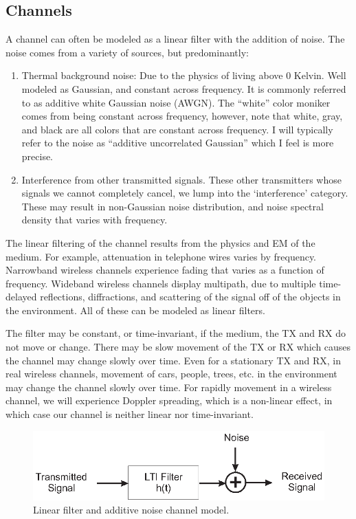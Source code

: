 \subsection{Channels}

A channel can often be modeled as a linear filter with the
addition of noise.  The noise comes from a variety of sources, but
predominantly:
\begin{enumerate}
  \item Thermal background noise:  Due to the physics of living
  above 0 Kelvin.  Well modeled as Gaussian, and constant across frequency.  It is
  commonly referred to as additive white Gaussian noise (AWGN).  The ``white'' color moniker comes from being constant across frequency, however, note that white, gray, and black are all colors
  that are constant across frequency.  I will typically refer to the noise as ``additive uncorrelated Gaussian'' which I feel is more precise.
  \item Interference from other transmitted signals.  These other
  transmitters whose signals we cannot completely cancel, we lump
  into the `interference' category.  These may result in non-Gaussian
  noise distribution, and  noise spectral density that varies with frequency.
\end{enumerate}
The linear filtering of the channel results from the physics and EM
of the medium.  For example, attenuation in telephone wires varies
by frequency.  Narrowband wireless channels experience fading that
varies as a function of frequency.  Wideband wireless
channels display multipath, due to multiple time-delayed
reflections, diffractions, and scattering of the signal off of the
objects in the environment.  All of these can be modeled as linear
filters.  

The filter may be constant, or time-invariant, if the medium, the TX
and RX do not move or change.  There may be slow movement of the TX or RX which causes the
channel may change slowly over time.  Even for a stationary TX
and RX, in real wireless channels, movement of cars, people, trees,
etc. in the environment may change the channel slowly over time.  For rapidly movement in a wireless channel, we will experience Doppler spreading, which is a non-linear effect, in which case our channel is neither linear nor time-invariant.

\begin{figure}[htbp]
  \centerline{\includegraphics[width=\textwidth]{../images/Channel-Detail-Diagram.eps}}
  \caption{Linear filter and additive noise channel model.}
  \label{F:Channel-Blocks}
\end{figure}

